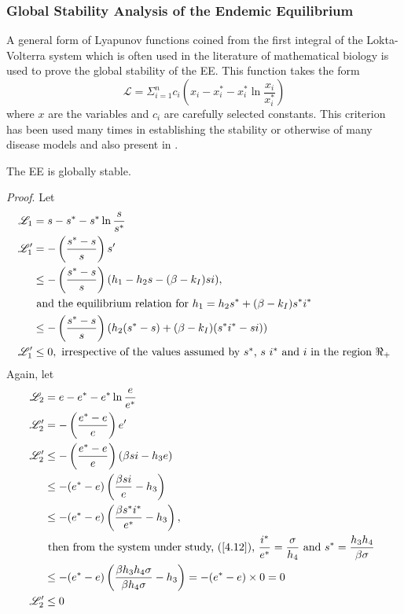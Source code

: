 \subsubsection{Global Stability Analysis of the Endemic Equilibrium}
A general form of Lyapunov functions coined from the first integral of the Lokta-Volterra system which is often used in the literature of mathematical biology is used to prove the global stability of the EE. This function takes the form $$ \mathscr{L} = \Sigma_{i=1}^{n}c_{i}\left(x_{i} - x_{i}^{*} - x_{i}^{*}\ln\dfrac{x_{i}}{x^{*}_{i}}\right) $$ where $ x $ are the variables and $ c_{i} $ are carefully selected constants. This criterion has been used many times in establishing the stability or otherwise of many disease models and also present in \parencite{shuai2013global}.
\begin{theorem}
	The EE is globally stable.
\end{theorem}
\textit{Proof}.
Let 
\begin{equation}
\begin{aligned}
\mathscr{L}_{1} &= s - s^{*} - s^{*}\ln\frac{s}{s^{*}}\\
\mathscr{L}_{1}' &= -\left(\dfrac{s^{*} - s}{s}\right) s'\\
&\leq -\left(\dfrac{s^{*} - s}{s}\right)(h_{1}  -h_{2}s - (\beta - k_{I})si), \\
&\text{ and the equilibrium relation for $ h_{1} = h_{2}s^{*} + (\beta - k_{I})s^{*}i^{*} $ }\\
&\leq -\left(\dfrac{s^{*} - s}{s}\right)(h_{2}(s^{*} - s) + (\beta - k_{I})(s^{*}i^{*} - si) )\\
\mathscr{L}_{1}'&\leq 0, \mbox{ irrespective of the values assumed by $ s^{*} $, $ s $ $ i^{*} $ and $ i $ in the region $ \Re_{+} $} 
\end{aligned}
\end{equation}
Again, let 
\begin{equation}
\begin{aligned}
\mathscr{L}_{2} &= e - e^{*} - e^{*}\ln\frac{e}{e^{*}}\\
\mathscr{L}_{2}' &= -\left(\dfrac{e^{*} - e}{e}\right) e'\\
\mathscr{L}_{2}' &\leq -\left(\dfrac{e^{*} - e}{e}\right)(\beta si - h_{3}e)\\
&\leq -(e^{*} - e)\left(\dfrac{\beta si}{e} - h_{3}\right)\\
&\leq -(e^{*} - e)\left(\dfrac{\beta s^{*}i^{*}}{e^{*}} - h_{3}\right),\\
&\text{ then from the system under study, (\ref{4.12}), $ \dfrac{i^{*}}{e^{*}} = \dfrac{\sigma}{h_{4}} $ and $ s^{*} =  \dfrac{h_{3}h_{4}}{\beta\sigma} $ }\\
&\leq -(e^{*} - e)\left(\dfrac{\beta h_{3}h_{4}\sigma}{\beta h_{4}\sigma} - h_{3}\right) = -(e^{*} - e)\times 0 = 0\\
\mathscr{L}_{2}' &\leq 0 
\end{aligned}
\end{equation}

